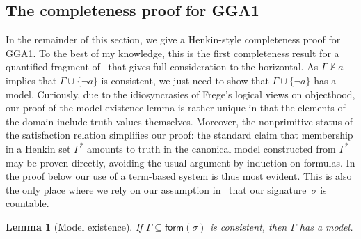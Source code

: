 \documentclass{preprint}
\newtheorem{lemma}[theorem]{Lemma}
\newcommand{\form}{\mathsf{form}}
\newcommand{\GGA}{\textsf{GGA1}}
\begin{document}
\subsection{The completeness proof for \GGA} \label{subsec:completeness}

In the remainder of this section, we give a Henkin-style completeness proof for \GGA.  
To the best of my knowledge, this is the first completeness result for a quantified fragment of \gga~that gives full consideration to the horizontal. 
As $\Gamma \not\vdash a$ implies that $\Gamma \cup \{\neg a \}$ is consistent, 
we just need to show that $\Gamma \cup \{\neg a \}$ has a model. 
Curiously, due to the idiosyncrasies of Frege's logical views on objecthood, our proof of the model existence lemma is rather unique in that the elements of the domain include truth values themselves. 
Moreover, the nonprimitive status of the satisfaction relation simplifies our proof:  
the standard claim that membership in a Henkin set $\Gamma^*$ amounts to truth in the canonical model constructed from $\Gamma^*$ may be proven directly, avoiding the usual argument by induction on formulas. 
In the proof below our use of a term-based system is thus most evident. 
This is also the only place where we rely on our assumption in~ that our signature~$\sigma$ is countable. 

\begin{lemma}[Model existence] 
	If $\Gamma \subseteq \form(\sigma)$ is consistent, then $\Gamma$ has a model. 
\end{lemma}
\end{document}
